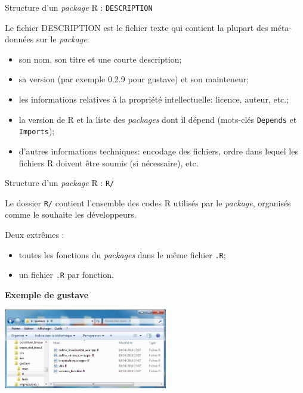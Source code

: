 \documentclass[12pt,handout,ignorenonframetext,]{beamer}
\providecommand{\tightlist}{%
  \setlength{\itemsep}{0pt}\setlength{\parskip}{0pt}}
\newcommand{\intertitre}[1]{\textbf{\textcolor{redInsee}{#1}}}
\begin{document}
\begin{frame}[fragile]{Structure d'un \emph{package} R :
\texttt{DESCRIPTION}}

Le fichier DESCRIPTION est le fichier texte qui contient la plupart des
méta-données sur le \emph{package}:

\begin{itemize}
\tightlist
\item
  \pause son nom, son titre et une courte description;
\item
  \pause sa version (par exemple 0.2.9 pour gustave) et son mainteneur;
\item
  \pause les informations relatives à la propriété intellectuelle:
  licence, auteur, etc.;
\item
  \pause la version de R et la liste des \emph{packages} dont il dépend
  (mots-clés \texttt{Depends} et \texttt{Imports});
\item
  \pause d'autres informations techniques: encodage des fichiers, ordre
  dans lequel les fichiers R doivent être soumis (si nécessaire), etc.
\end{itemize}

\end{frame}

\begin{frame}[fragile]{Structure d'un \emph{package} R : \texttt{R/}}

Le dossier \texttt{R/} contient l'ensemble des codes R utilisés par le
\emph{package}, organisés comme le souhaite les développeurs.

\pause \bigskip Deux extrêmes :

\begin{itemize}
\tightlist
\item
  \pause \vspace{-0.3cm} toutes les fonctions du \emph{packages} dans le
  même fichier \texttt{.R};
\item
  \pause un fichier \texttt{.R} par fonction.
\end{itemize}

\pause \intertitre{Exemple de gustave}

\begin{center}
\includegraphics[height=3.5cm]{R_gustave.png}
\end{center}

\end{frame}
\end{document}
